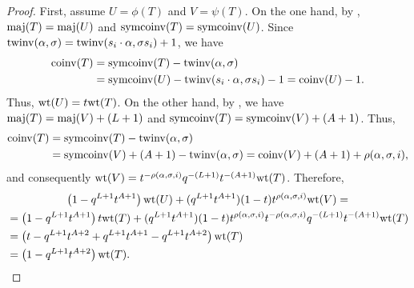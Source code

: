 \begin{proof}
    First, assume \(U = \phi(T)\) and \(V = \psi(T)\).
    On the one hand, by , \(\maj(T) = \maj(U)\) and \(\symcoinv(T) = \symcoinv(U)\).
    Since \(\operatorname{twinv}(\alpha, \sigma) = \operatorname{twinv}(s_i \cdot \alpha, \sigma s_i) + 1\),
    we have
    \begin{align*}
        \coinv(T)
        & = \symcoinv(T) - \twinv(\alpha, \sigma) \\
        & = \symcoinv(U) - \twinv(s_i \permact \alpha, \sigma s_i) - 1
        = \coinv(U) - 1.
    \end{align*}
    Thus, \(\wt(U) = t \wt(T)\).
    On the other hand, by , we have \(\maj(T) = \maj(V) + (L+1)\) and \(\symcoinv(T) = \symcoinv(V) + (A+1)\).
    Thus,
    \begin{align*}
        \coinv(T)
        & = \symcoinv(T) - \twinv(\alpha, \sigma) \\
        & = \symcoinv(V) + (A+1) - \twinv(\alpha, \sigma)
        = \coinv(V) + (A+1) + \rho(\alpha, \sigma, i),
    \end{align*}
    and consequently \(\wt(V) = t^{-\rho(\alpha,\sigma,i)} q^{-(L+1)} t^{-(A+1)} \wt(T)\).
    Therefore,
    \begin{multline*}
        \left( 1 - q^{L+1} t^{A+1} \right) \wt(U)
        +
        (q^{L+1} t^{A+1}) (1 - t) t^{\rho(\alpha,\sigma,i)} \wt(V)
        = \\
        \begin{aligned}
        &=
        \left( 1 - q^{L+1} t^{A+1} \right) t \wt(T)
        +
        (q^{L+1} t^{A+1}) (1 - t) t^{\rho(\alpha,\sigma,i)} t^{-\rho(\alpha,\sigma,i)} q^{-(L+1)} t^{-(A+1)} \wt(T) \\
        &=
        \left( t - q^{L+1} t^{A+2} + q^{L+1} t^{A+1} - q^{L+1} t^{A+2} \right) \wt(T) \\
        &=
        \left( 1 - q^{L+1} t^{A+2} \right) \wt(T).
        \end{aligned}
    \end{multline*}


\end{proof}
